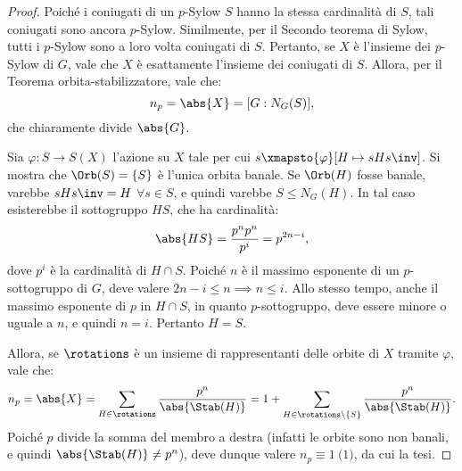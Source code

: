 \documentclass[12pt]{scrartcl}
\begin{document}
	\begin{proof}
		Poiché i coniugati di un $p$-Sylow $S$ hanno la stessa cardinalità di $S$, tali coniugati sono ancora
		$p$-Sylow. Similmente, per il Secondo teorema di Sylow, tutti
		i $p$-Sylow sono a loro volta coniugati di $S$. Pertanto,
		se $X$ è l'insieme dei $p$-Sylow di $G$, vale che
		$X$ è esattamente l'insieme dei coniugati di $S$. Allora,
		per il Teorema orbita-stabilizzatore, vale che:
		\[ n_p = \abs{X} = [G : N_G(S)], \]
		che chiaramente divide $\abs{G}$. \medskip
		
		
		Sia $\varphi : S \to S(X)$ l'azione su $X$ tale per cui
		$s \xmapsto{\varphi} [H \mapsto sHs\inv]$. Si mostra
		che $\Orb(S) = \{S\}$ è l'unica orbita banale. Se
		$\Orb(H)$ fosse banale, varebbe $sHs\inv = H$ $\forall s \in S$,
		e quindi varebbe $S \leq N_G(H)$. In tal caso esisterebbe
		il sottogruppo $HS$, che ha cardinalità:
		\[ \abs{HS} = \frac{p^n p^n}{p^i} = p^{2n-i}, \]
		dove $p^i$ è la cardinalità di $H \cap S$. Poiché
		$n$ è il massimo esponente di un $p$-sottogruppo di
		$G$, deve valere $2n-i \leq n \implies n \leq i$. Allo
		stesso tempo, anche il massimo esponente di $p$ in
		$H \cap S$, in quanto $p$-sottogruppo, deve essere
		minore o uguale a $n$, e quindi $n = i$. Pertanto
		$H = S$. \medskip
		
		
		Allora, se $\rotations$ è un insieme di rappresentanti
		delle orbite di $X$ tramite $\varphi$, vale che:
		\[ n_p = \abs{X} = \sum_{H \in \rotations} \frac{p^n}{\abs{\Stab(H)}} = 1 + \sum_{H \in \rotations \setminus \{S\}} \frac{p^n}{\abs{\Stab(H)}}. \]
		Poiché $p$ divide la somma del membro a destra (infatti
		le orbite sono non banali, e quindi $\abs{\Stab(H)} \neq p^n$),
		deve dunque valere $n_p \equiv 1 \pod 1$, da cui la tesi.
	\end{proof}
\end{document}
